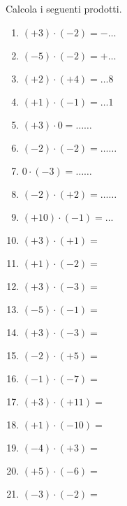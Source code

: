 \begin{esercizio}
 \label{ese:2.16}
Calcola i seguenti prodotti.
\begin{multicols}{3}
 \begin{enumerate}[noitemsep, label=(\alph*)]
 \item \((+3)\cdot(-2) =-\ldots\)
 \item \((-5)\cdot(-2)=+\ldots\)
 \item \((+2)\cdot(+4) =\ldots8\)
 \item \((+1)\cdot(-1) =\ldots1\)
 \item \((+3)\cdot0 = \ldots\ldots\)
 \item \((-2)\cdot(-2) =\ldots\ldots\)
 \item \(0\cdot(-3) = \ldots\ldots\)
 \item \((-2)\cdot(+2) =\ldots\ldots\)
 \item \((+10)\cdot(-1) =\ldots\)
 \item \((+3)\cdot(+1) =\)
 \item \((+1)\cdot(-2) =\)
 \item \((+3)\cdot(-3) =\)
 \item \((-5)\cdot(-1) =\)
 \item \((+3)\cdot(-3) =\)
 \item \((-2)\cdot(+5) =\)
 \item \((-1)\cdot(-7) =\)
 \item \((+3)\cdot(+11) =\)
 \item \((+1)\cdot(-10) =\)
 \item \((-4)\cdot(+3) =\)
 \item \((+5)\cdot(-6) =\)
 \item \((-3)\cdot(-2) =\)
 \end{enumerate}
\end{multicols}
\end{esercizio}

